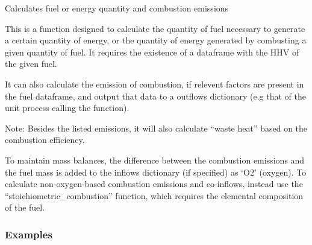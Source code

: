 \documentclass[a4paper,10pt,english]{sphinxmanual}
\begin{document}
\begin{fulllineitems}
\label{\detokenize{calculators:calculators.Combustion}}
Calculates fuel or energy quantity and combustion emissions

This is a function designed to calculate the quantity of fuel
necessary to generate a certain quantity of energy, or the quantity
of energy generated by combusting a given quantity of fuel. It requires
the existence of a dataframe with the HHV of the given fuel.

It can also calculate the emission of combustion, if relevent factors are
present in the fuel dataframe, and output that data to a outflows dictionary
(e.g that of the unit process calling the function).

Note:
Besides the listed emissions, it will also calculate “waste heat” based on
the combustion efficiency.

To maintain mass balances, the difference between the combustion emissions
and the fuel mass is added to the inflows dictionary (if specified) as
‘O2’ (oxygen). To calculate non-oxygen-based combustion emissions and
co-inflows, instead use the “stoichiometric\_combustion” function, which
requires the elemental composition of the fuel.
\subsubsection*{Examples}

\begin{sphinxVerbatim}[commandchars=\\\{\}]
   
\end{sphinxVerbatim}


\end{fulllineitems}
\end{document}
